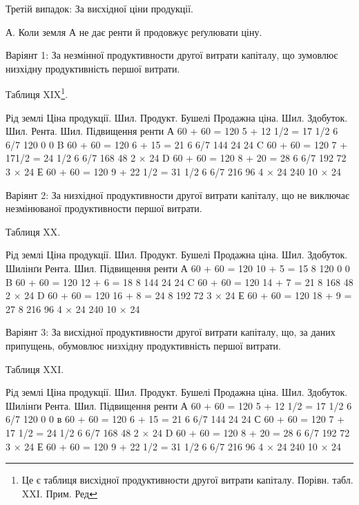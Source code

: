 Третій випадок: За висхідної ціни продукції.

А. Коли земля А не дає ренти й продовжує реґулювати ціну.

Варіянт 1: За незмінної продуктивности другої витрати капіталу, що зумовлює
низхідну продуктивність першої витрати.

Таблиця XIX\footnote*{
Це є таблиця висхідної продуктивности другої витрати капіталу. Порівн. табл. XXI. Прим. Ред
}.

Рід  землі
Ціна продукції. Шил.
Продукт. Бушелі
Продажна ціна. Шил.
Здобуток. Шил.
Рента. Шил.
Підвищення ренти
А    60 + 60 = 120    5 + 12 1/2 = 17 1/2     6 6/7    120            0    0
B    60 + 60 = 120    6 + 15 = 21                    6 6/7    144     24    24
C    60 + 60 = 120    7 + 171/2 = 24 1/2     6 6/7    168           48    2 × 24
D    60 + 60 = 120    8 + 20 = 28                    6 6/7    192           72    3 × 24
Е    60 + 60 = 120    9 + 22 1/2 = 31 1/2    6 6/7    216           96    4 × 24
                    240              10 × 24

Варіянт 2: За низхідної продуктивности другої витрати капіталу, що не виключає
незмінюваної продуктивности першої витрати.

Таблиця XX.

Рід  землі
 Ціна продукції. Шил.
Продукт. Бушелі
Продажна ціна. Шил.
Здобуток. Шилінґи
Рента. Шил.
Підвищення ренти
А 60 + 60 = 120 10 + 5 = 15 8 120 0 0
B 60 + 60 = 120 12 + 6 = 18 8 144 24 24
C 60 + 60 = 120 14 + 7 = 21 8 168 48 2 × 24
D 60 + 60 = 120 16 + 8 = 24 8 192 72 3 × 24
Е 60 + 60 = 120 18 + 9 = 27 8 216 96 4 × 24
                    240    10 × 24

Варіянт 3: За висхідної продуктивности другої витрати капіталу, що, за даних
припущень, обумовлює низхідну продуктивність першої витрати.

Таблиця XXI.

Рід  землі
Ціна продукції. Шил.
Продукт. Бушелі
Продажна  ціна. Шил.
Здобуток. Шилінґи
Рента. Шил.
Підвищення ренти
А    60 + 60 = 120    5 + 12 1/2 = 17 1/2      6 6/7    120            0    0
в    60 + 60 = 120    6 + 15 = 21                    6 6/7    144            24    24
С    60 + 60 = 120    7 + 17 1/2 = 24 1/2      6 6/7    168            48    2 × 24
D    60 + 60 = 120    8 + 20 = 28                    6 6/7    192            72    3 × 24
Е    60 + 60 = 120    9 + 22 1/2 = 31 1/2       6 6/7    216            96    4 × 24
 240 10 × 24
